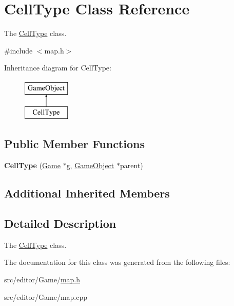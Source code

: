 \hypertarget{class_cell_type}{}\section{Cell\+Type Class Reference}
\label{class_cell_type}


The \hyperlink{class_cell_type}{Cell\+Type} class.  




{\ttfamily \#include $<$map.\+h$>$}

Inheritance diagram for Cell\+Type\+:\begin{figure}[H]
\begin{center}
\leavevmode
\includegraphics[height=2.000000cm]{class_cell_type}
\end{center}
\end{figure}
\subsection*{Public Member Functions}
\begin{DoxyCompactItemize}
\item 
\hypertarget{class_cell_type_a9764b05a46f0227100874d909ea0e0ce}{}\label{class_cell_type_a9764b05a46f0227100874d909ea0e0ce} 
{\bfseries Cell\+Type} (\hyperlink{class_game}{Game} $\ast$g, \hyperlink{class_game_object}{Game\+Object} $\ast$parent)
\end{DoxyCompactItemize}
\subsection*{Additional Inherited Members}


\subsection{Detailed Description}
The \hyperlink{class_cell_type}{Cell\+Type} class. 

The documentation for this class was generated from the following files\+:\begin{DoxyCompactItemize}
\item 
src/editor/\+Game/\hyperlink{map_8h}{map.\+h}\item 
src/editor/\+Game/map.\+cpp\end{DoxyCompactItemize}
